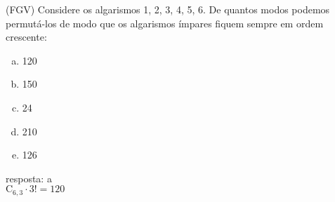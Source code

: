 \begin{ex}
 (FGV) Considere os algarismos 1, 2, 3, 4, 5, 6. De quantos modos podemos permutá-los de modo que os algarismos ímpares fiquem sempre em ordem crescente:
    \begin{enumerate}[(a)]
    \item 120
    \item 150
    \item 24
    \item 210
    \item 126
    \end{enumerate}
      \begin{sol}
        resposta: a  \\
        $\mathrm{C}_{6,3}\cdot3!=120$
      \end{sol}
\end{ex}